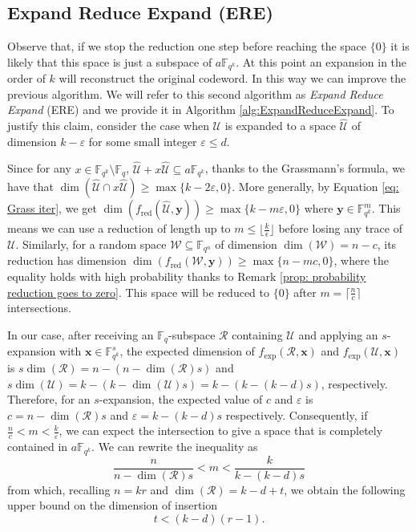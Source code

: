 \documentclass{article}
\newcommand{\Fq}{\mathbb{F}_{q}}
\newcommand{\Fqn}{\mathbb{F}_{q^n}}
\newcommand{\Fqk}{\mathbb{F}_{q^k}}
\newcommand{\calR}{\mathcal{R}}
\newcommand{\calU}{\mathcal{U}}
\newcommand{\calW}{\mathcal{W}}
\newcommand{\fred}{f_{\mathrm{red}}}
\newcommand{\fexp}{f_{\mathrm{exp}}}
\begin{document}
\subsection{Expand Reduce Expand (ERE)}
Observe  that, if we stop the reduction one step before reaching the space $\{0\}$ it is likely that this space is just a subspace of $a\Fqk$.
At this point an expansion in the order of $k$ will reconstruct the original codeword. In this way we can improve the previous algorithm.
We will refer to this second algorithm as \textit{Expand Reduce Expand} (ERE) and we provide it in Algorithm \ref{alg:ExpandReduceExpand}.
To justify this claim,  consider the case when $\calU$ is expanded to a space $\hat{\calU}$ of dimension $k - \varepsilon$ for some small integer $\varepsilon\leq d.$
\par Since for any $x \in \Fqk \setminus \Fq$, $\hat{\calU}+x \hat{\calU}\subseteq a\Fqk$, thanks to the Grassmann's formula, we have that 
$\dim(\hat{\calU} \cap x \hat{\calU}) \geq \max\{k - 2 \varepsilon,0\}$. More generally, by Equation \eqref{eq: Grass iter}, we get $\dim(\fred(\hat{\calU}, \bm y)) \geq \max\{k - m \varepsilon,0\}$ where $\bm y \in \Fqk^m$.
This means we can use a reduction of length up to $m \leq   \lfloor \frac{k}{\epsilon} \rfloor$ before losing any trace of $\calU$. Similarly, for a random space $\calW \subseteq \Fqn$ of dimension $\dim(\calW) = n - c$, its reduction has dimension 
$\dim(\fred(\calW, \bm y)) \geq \max\{n - mc,0\}$, where the equality holds with high probability thanks to Remark \ref{prop: probability reduction goes to zero}.
This space will be reduced to $\{0\}$ after $m = \lceil \frac{n}{c} \rceil$ intersections. \par
In our case, after receiving an $\mathbb{F}_q$-subspace $\calR$ containing $\calU$ and applying an $s$-expansion with $\bm x\in\mathbb{F}_{q^k}^s$, the expected dimension of $\fexp(\calR,\bm x)$ and $\fexp(\calU,\bm x)$ is $s\dim(\calR)=n-(n-\dim(\calR)s)$ and $s\dim(\calU)=k-(k-\dim(\calU)s)=k-(k-(k-d)s)$, respectively. 
Therefore, for an $s$-expansion, the expected value of $c$ and $\varepsilon$ is $c=n-\dim(\calR)s$ and $\varepsilon=k - (k-d)s$ respectively.
Consequently, if $ \frac{n}{c} <m< \frac{k}{\varepsilon}$, we can expect the intersection to give a space that is completely contained in $a \Fqk.$
We can rewrite the inequality as
$$
 \frac{n}{n-\dim(\calR)s} < m < \frac{k}{k - (k-d)s} 
$$
from which, recalling $n = kr$ and $\dim(\calR)=k-d+t$, we obtain the following upper bound on the dimension of insertion
\begin{equation}
\label{eq:ERE_max_t}
    t < (k-d)(r-1).
\end{equation}
\end{document}
